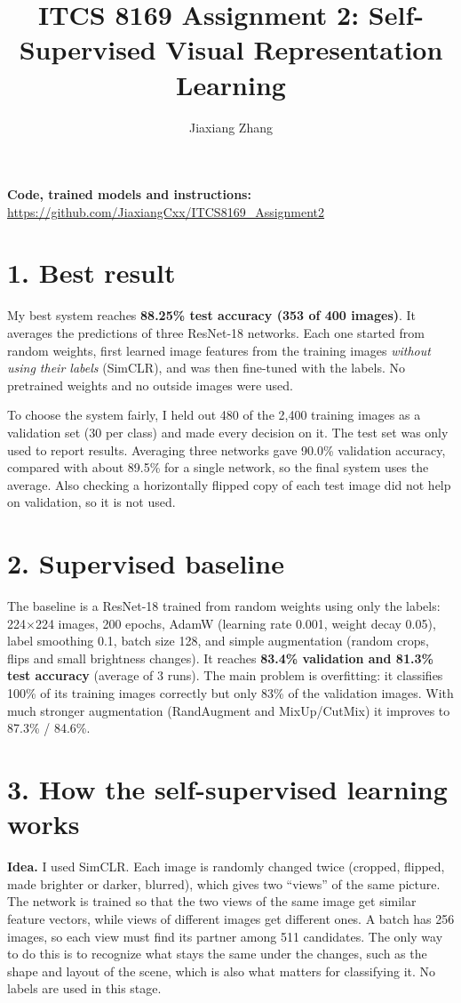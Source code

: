 \documentclass[10pt]{article}
\title{\vspace{-1.8em}ITCS 8169 Assignment 2: Self-Supervised Visual Representation Learning}
\author{Jiaxiang Zhang}
\date{}
\begin{document}
\maketitle
\vspace{-2.9em}

\textbf{Code, trained models and instructions:} \url{https://github.com/JiaxiangCxx/ITCS8169_Assignment2}

\section*{1. Best result}
My best system reaches \textbf{88.25\% test accuracy (353 of 400 images)}. It averages the predictions
of three ResNet-18 networks. Each one started from random weights, first learned image features from
the training images \emph{without using their labels} (SimCLR), and was then fine-tuned with the labels.
No pretrained weights and no outside images were used.

To choose the system fairly, I held out 480 of the 2,400 training images as a validation set (30 per
class) and made every decision on it. The test set was only used to report results. Averaging three
networks gave 90.0\% validation accuracy, compared with about 89.5\% for a single network, so the
final system uses the average. Also checking a horizontally flipped copy of each test image did not
help on validation, so it is not used.

\section*{2. Supervised baseline}
The baseline is a ResNet-18 trained from random weights using only the labels: 224$\times$224 images,
200 epochs, AdamW (learning rate 0.001, weight decay 0.05), label smoothing 0.1, batch size 128, and
simple augmentation (random crops, flips and small brightness changes). It reaches
\textbf{83.4\% validation and 81.3\% test accuracy} (average of 3 runs). The main problem is
overfitting: it classifies 100\% of its training images correctly but only 83\% of the validation
images. With much stronger augmentation (RandAugment and MixUp/CutMix) it improves to 87.3\% / 84.6\%.

\section*{3. How the self-supervised learning works}
\textbf{Idea.} I used SimCLR. Each image is randomly changed twice (cropped, flipped, made brighter or
darker, blurred), which gives two ``views'' of the same picture. The network is trained so that the two
views of the same image get similar feature vectors, while views of different images get different
ones. A batch has 256 images, so each view must find its partner among 511 candidates. The only
way to do this is to recognize what stays the same under the changes, such as the shape and layout of
the scene, which is also what matters for classifying it. No labels are used in this stage.
\end{document}
